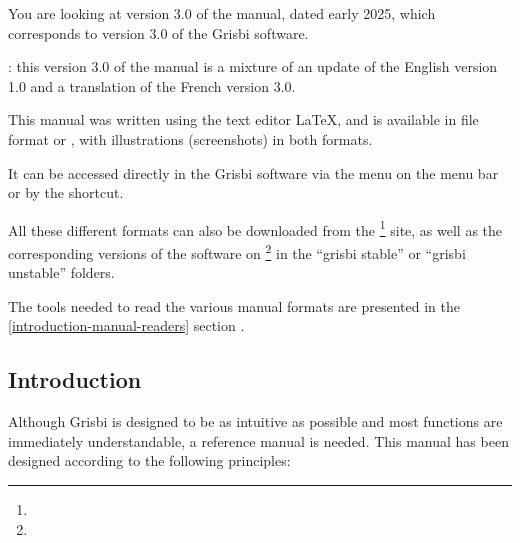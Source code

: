You are looking at version \actuality{}3.0 of the manual, dated \actuality{} early 2025, which corresponds to version 3.0 of the Grisbi software.


\Note{}: this version 3.0 of the manual is a mixture of an update of the English version 1.0 and a translation of the French version 3.0.


This manual was written using the \gls{text editor} \gls{LaTeX}, and is available in \gls{file format}  or , with illustrations (screenshots) in both formats.


It can be accessed directly in the Grisbi software via the  menu on the menu bar or by the  shortcut.


All these different formats can also be downloaded from the \footnote{\urlSourceForgeDocumentation{}} site, as well as the corresponding versions of the software on \footnote{\urlSourceForge{}} in the ``\textsf{grisbi stable}'' or ``\textsf{grisbi unstable}'' folders.


The tools needed to read the various manual formats are presented in the  \vref{introduction-manual-readers} section .


\subsection{Introduction \label{introduction-manual-presentation}}

Although Grisbi is designed to be as intuitive as possible and most functions are immediately understandable, a reference manual is needed. This manual has been designed according to the following principles:

